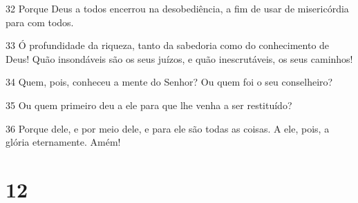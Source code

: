 \par 32 Porque Deus a todos encerrou na desobediência, a fim de usar de misericórdia para com todos.
\par 33 Ó profundidade da riqueza, tanto da sabedoria como do conhecimento de Deus! Quão insondáveis são os seus juízos, e quão inescrutáveis, os seus caminhos!
\par 34 Quem, pois, conheceu a mente do Senhor? Ou quem foi o seu conselheiro?
\par 35 Ou quem primeiro deu a ele para que lhe venha a ser restituído?
\par 36 Porque dele, e por meio dele, e para ele são todas as coisas. A ele, pois, a glória eternamente. Amém!

\chapter{12}

